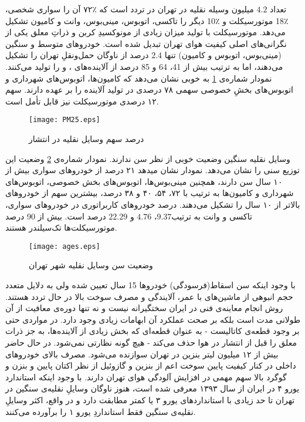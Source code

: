 \documentclass[12pt]{atu}
\begin{document}
تعداد $4.2$ میلیون وسیله نقلیه در تهران در تردد است که ٪۷۲ آن را سواری شخصی، ٪18 موتورسیکلت و ٪10 دیگر را تاکسی، اتوبوس، مینی‌بوس، وانت و کامیون تشکیل می‌دهد. 
موتورسیکلت با تولید میزان زیادی از مونوکسیدِ کربن و ذراتِ معلق یکی از نگرانی‌های اصلی کیفیت هوای تهران تبدیل شده است. خودروهای متوسط و سنگین (مینی‌بوس، اتوبوس و کامیون) تنها $2.4$ درصد از ناوگان حمل‌و‌نقلِ تهران را تشکیل می‌دهند، اما به ترتیب بیش از 41، 64 و 85 درصد از آلاینده‌های
{\scriptsize {}}،
{\scriptsize {}}  و
{\scriptsize {}}  
را تولید می‌کنند.
نمودار شماره‌ی 
\ref{fig:PM25}
به خوبی نشان می‌دهد که کامیون‌ها، اتوبوس‌های شهرداری و اتوبوس‌های بخشِ خصوصی سهمی ۷۸ درصدی در تولید آلاینده 
 {\scriptsize {}}
را بر عهده دارند. سهم ۱۲ درصدی موتورسیکلت نیز قابل تأمل است. 
\cite{Shahbazi_2016}
\vspace{-0.4cm}
\begin{figure}[!ht]
	\centering
	\texttt{[image: PM25.eps]}
	\caption{درصد سهم وسایل نقلیه در انتشار {\scriptsize {}}} \label{fig:PM25}
\end{figure}
\vspace{-0.4cm}

وسایل نقلیه سنگین وضعیت خوبی از نظر سن ندارند. نمودار شماره‌ی
\ref{fig:age}
وضعیت این توزیع سنی را نشان می‌دهد. نمودار نشان مید‌هد ۲۱ درصد از خودروهای سواری بیش از ۱۰ سال سن دارند، همچنین مینی‌بوس‌ها، اتوبوس‌های بخش خصوصی، اتوبوس‌های شهرداری و کامیون‌ها به ترتیب با ۷۲، ۵۴، ۴۰ و  ۳۸ درصد، بیشترین سهم از خودروهای بالاتر از ۱۰ سال را تشکیل می‌دهند. درصد خودروهای کاربراتوری در خودروهای سواری، تاکسی و وانت به ترتیب$9.37$، $4.76$ و $22.29$ درصد است. بیش از 90 درصد موتورسیکلت‌ها تک‌سیلندر هستند.
\cite{Shahbazi_2016}

\vspace{-0.3cm}
\begin{figure}[!ht]
	\centering
	\texttt{[image: ages.eps]}
	\caption{وضعیت سن وسایل نقلیه شهر تهران} \label{fig:age}
\end{figure}
\vspace{-0.4cm}

 با وجود اینکه سن اسقاط(فرسودگی) خودروها 15 سال
  تعیین شده ولی به دلایل متعدد حجم انبوهی از ماشین‌های با عمر، آلایندگی و مصرف سوخت بالا در حال تردد هستند. روش انجام معاینه‌ی فنی در ایران سختگیرانه نیست و نه تنها دوره‌ی معافیت از آن طولانی مدت است بلکه بر صحت عملکرد آن ابهامات زیادی وجود دارد. در مواردی حتی بر وجود قطعه‌ی کاتالیست - به عنوان قطعه‌ای که بخش زیادی از آلاینده‌ها، به جز ذرات معلق را قبل از انتشار در هوا حذف می‌کند - هیچ گونه نظارتی نمی‌شود.
\cite{tahami}
در حال حاضر بیش از ۱۲ میلیون لیتر بنزین در تهران سوازنده می‌شود. مصرف بالای خودروهای داخلی در کنار کیفیت پایین سوخت اعم از بنزین و گازوئیل از نظر اکتان پایین و بنزن و گوگرد بالا سهم مهمی در افزایش آلودگی هوای تهران دارند.
 \cite{fuelq1394}
\cite{rahimi2020}
با وجود اینکه استاندارد یورو ۴ در ایران از سال ۱۳۹۳ معرفی شده است، هنوز ناوگان وسایلِ نقلیه‌ی سنگین در تهران تا حد زیادی با استانداردهای یورو ۳ یا کمتر مطابقت دارد و در واقع، اکثر وسایلِ نقلیه‌ی سنگین فقط استانداردِ یورو ۱ را برآورده می‌کنند.
\cite{tehranairworldbank}
\cite{amarnaft1397}
  
\end{document}
